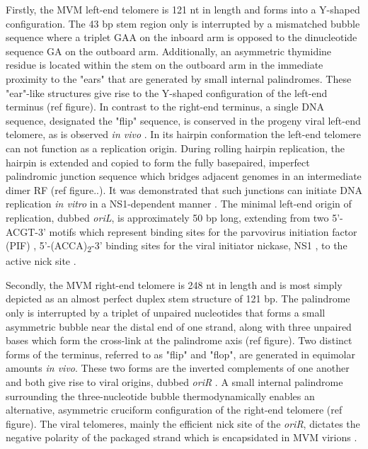Firstly, the MVM left-end telomere is 121 nt in length and forms into a Y-shaped configuration. The 43 bp stem region only is interrupted by a mismatched bubble sequence where a triplet GAA on the inboard arm is opposed to the dinucleotide sequence GA on the outboard arm. Additionally, an asymmetric thymidine residue is located within the stem on the outboard arm in the immediate proximity to the "ears" that are generated by small internal palindromes. These "ear"-like structures give rise to the Y-shaped configuration of the left-end terminus \cite{pmid225040, pmid6298737, pmid3973977, replication} (ref figure). In contrast to the right-end terminus, a single DNA sequence, designated the "flip" sequence, is conserved in the progeny viral left-end telomere, as is observed \textit{in vivo} \cite{pmid3973977}. In its hairpin conformation the left-end telomere can not function as a replication origin. During rolling hairpin replication, the hairpin is extended and copied to form the fully basepaired, imperfect palindromic junction sequence which bridges adjacent genomes in an intermediate dimer RF (ref figure..). It was demonstrated that such junctions can initiate DNA replication \textit{in vitro} in a NS1-dependent manner \cite{pmid8076610}. The minimal left-end origin of replication, dubbed \textit{oriL}, is approximately 50 bp long, extending from two 5'-ACGT-3' motifs which represent binding sites for the parvovirus initiation factor (PIF) \cite{pmid8995666, pmid9223459, pmid10523663}, 5'-(ACCA)\textsubscript{2}-3' binding sites for the viral initiator nickase, NS1 \cite{pmid7853501}, to the active nick site \cite{pmid8076610}.    

Secondly, the MVM right-end telomere is 248 nt in length and is most simply depicted as an almost perfect duplex stem structure of 121 bp. The palindrome only is interrupted by a triplet of unpaired nucleotides that forms a small asymmetric bubble near the distal end of one strand, along with three unpaired bases which form the cross-link at the palindrome axis \cite{pmid6298737, pmid3973977} (ref figure). Two distinct forms of the terminus, referred to as "flip" and "flop", are generated in equimolar amounts \textit{in vivo}. These two forms are the inverted complements of one another and both give rise to viral origins, dubbed \textit{oriR} \cite{pmid1388310, pmid9765384, pmid10627544}. A small internal palindrome surrounding the three-nucleotide bubble thermodynamically enables an alternative, asymmetric cruciform configuration of the right-end telomere \cite{pmid6602687} (ref figure). The viral telomeres, mainly the efficient nick site of the \textit{oriR}, dictates the negative polarity of the packaged strand which is encapsidated in MVM virions \cite{pmid15681430}. 

